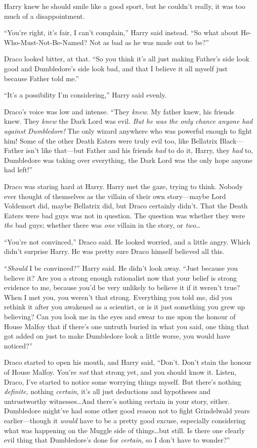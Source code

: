 Harry knew he should smile like a good sport, but he couldn’t really, it was too much of a disappointment.

“You’re right, it’s fair, I can’t complain,” Harry said instead. “So what about He-Who-Must-Not-Be-Named? Not as bad as he was made out to be?”

Draco looked bitter, at that. “So you think it’s all just making Father’s side look good and Dumbledore’s side look bad, and that I believe it all myself just because Father told me.”

“It’s a possibility I’m considering,” Harry said evenly.

Draco’s voice was low and intense. “They \emph{knew}. My father knew, his friends knew. They \emph{knew} the Dark Lord was evil. \emph{But he was the only chance anyone had against Dumbledore!} The only wizard anywhere who was powerful enough to fight him! Some of the other Death Eaters were truly evil too, like Bellatrix Black—Father isn’t like that—but Father and his friends \emph{had} to do it, Harry, they \emph{had} to, Dumbledore was taking over everything, the Dark Lord was the only hope anyone had left!”

Draco was staring hard at Harry. Harry met the gaze, trying to think. Nobody ever thought of themselves as the villain of their own story—maybe Lord Voldemort did, maybe Bellatrix did, but Draco certainly didn’t. That the Death Eaters were bad guys was not in question. The question was whether they were \emph{the} bad guys; whether there was \emph{one} villain in the story, or \emph{two…}

“You’re not convinced,” Draco said. He looked worried, and a little angry. Which didn’t surprise Harry. He was pretty sure Draco himself believed all this.

“\emph{Should} I be convinced?” Harry said. He didn’t look away. “Just because you believe it? Are you a strong enough rationalist now that your belief is strong evidence to me, because you’d be very unlikely to believe it if it weren’t true? When I met you, you weren’t that strong. Everything you told me, did you rethink it after you awakened as a scientist, or is it just something you grew up believing? Can you look me in the eyes and swear to me upon the honour of House Malfoy that if there’s one untruth buried in what you said, one thing that got added on just to make Dumbledore look a little worse, you would have noticed?”

Draco started to open his mouth, and Harry said, “Don’t. Don’t stain the honour of House Malfoy. You’re \emph{not} that strong yet, and you should know it. Listen, Draco, I’ve started to notice some worrying things myself. But there’s nothing \emph{definite,} nothing \emph{certain,} it’s all just deductions and hypotheses and untrustworthy witnesses…And there’s nothing certain in your story, either. Dumbledore might’ve had some other good reason not to fight Grindelwald years earlier—though it \emph{would} have to be a pretty good excuse, especially considering what was happening on the Muggle side of things…but still. Is there one clearly evil thing that Dumbledore’s done for \emph{certain,} so I don’t have to wonder?”


